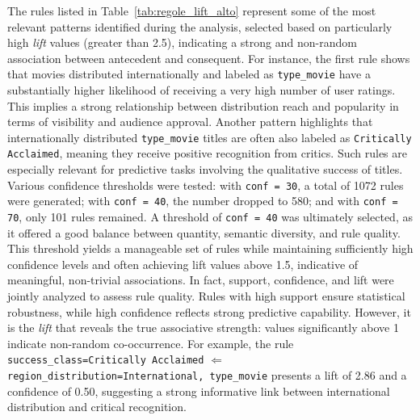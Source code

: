 \documentclass[10pt]{article}
\begin{document}
The rules listed in Table~\ref{tab:regole_lift_alto} represent some of the most relevant patterns identified during the analysis, selected based on particularly high \textit{lift} values (greater than 2.5), indicating a strong and non-random association between antecedent and consequent.
For instance, the first rule shows that movies distributed internationally and labeled as \texttt{type\_movie} have a substantially higher likelihood of receiving a very high number of user ratings. This implies a strong relationship between distribution reach and popularity in terms of visibility and audience approval.
Another pattern highlights that internationally distributed \texttt{type\_movie} titles are often also labeled as \texttt{Critically Acclaimed}, meaning they receive positive recognition from critics. Such rules are especially relevant for predictive tasks involving the qualitative success of titles.
Various confidence thresholds were tested: with \texttt{conf = 30}, a total of 1072 rules were generated; with \texttt{conf = 40}, the number dropped to 580; and with \texttt{conf = 70}, only 101 rules remained. A threshold of \texttt{conf = 40} was ultimately selected, as it offered a good balance between quantity, semantic diversity, and rule quality. This threshold yields a manageable set of rules while maintaining sufficiently high confidence levels and often achieving lift values above 1.5, indicative of meaningful, non-trivial associations.
In fact, support, confidence, and lift were jointly analyzed to assess rule quality. Rules with high support ensure statistical robustness, while high confidence reflects strong predictive capability. However, it is the \textit{lift} that reveals the true associative strength: values significantly above 1 indicate non-random co-occurrence. For example, the rule \texttt{success\_class=Critically Acclaimed} $\Leftarrow$ \texttt{region\_distribution=International, type\_movie} presents a lift of 2.86 and a confidence of 0.50, suggesting a strong informative link between international distribution and critical recognition.
\end{document}
